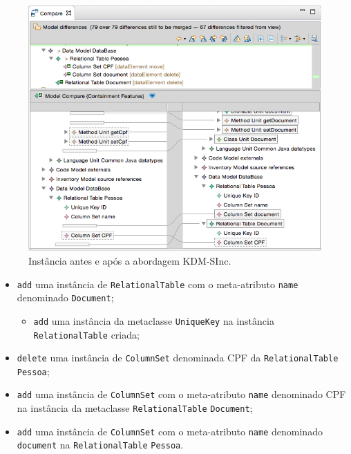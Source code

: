 \begin{figure}[!h]
	\centering
	\caption{Instância antes e após a abordagem KDM-SInc.}
	\label{fig:efeitoPropagacaoKDMSINC}
	\includegraphics[scale=0.6]{images/propagacaoKDMEfeito}
	\fautor
\end{figure}

\begin{itemize}
    \item \texttt{add} uma instância de \texttt{RelationalTable} com o meta-atributo \texttt{name} denominado \texttt{Document};
    
    \begin{itemize}
        \item \texttt{add} uma instância da metaclasse \texttt{UniqueKey} na instância \texttt{RelationalTable} criada;
    \end{itemize}
    
    \item \texttt{delete} uma instância de \texttt{ColumnSet} denominada CPF da \texttt{RelationalTable} \texttt{Pessoa};
    
    \item \texttt{add} uma instância de \texttt{ColumnSet} com o meta-atributo \texttt{name} denominado CPF na instância da metaclasse \texttt{RelationalTable} \texttt{Document};
    
    \item \texttt{add} uma instância de \texttt{ColumnSet} com o meta-atributo \texttt{name} denominado \texttt{document} na \texttt{RelationalTable} \texttt{Pessoa}.

    
\end{itemize}

